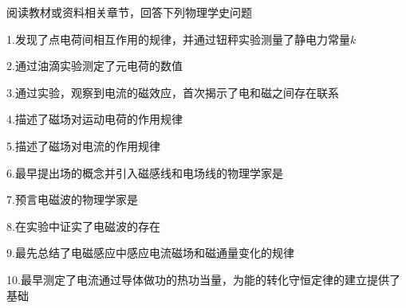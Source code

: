 阅读教材或资料相关章节，回答下列物理学史问题

	1.\lunl{3em}发现了点电荷间相互作用的规律，并通过钮秤实验测量了静电力常量\(k\)

	2.\lunl{4em}通过油滴实验测定了元电荷的数值

	3.\lunl{4em}通过实验，观察到电流的磁效应，首次揭示了电和磁之间存在联系

	4.\lunl{4em}描述了磁场对运动电荷的作用规律

	5.\lunl{4em}描述了磁场对电流的作用规律

	6.最早提出场的概念并引入磁感线和电场线的物理学家是\lunl{4em}

	7.预言电磁波的物理学家是\lunl{4em}

	8.\lunl{3em}在实验中证实了电磁波的存在

	9.\lunl{3em}最先总结了电磁感应中感应电流磁场和磁通量变化的规律

	10.\lunl{3em}最早测定了电流通过导体做功的热功当量，为能的转化守恒定律的建立提供了基础
